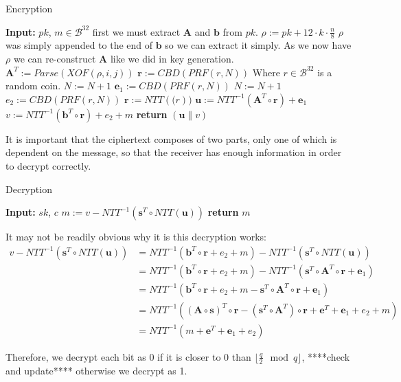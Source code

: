 \documentclass[a4paper, 10pt]{article}
\theoremstyle{definition}
\begin{document}
\begin{algorithm}[H]
    \caption{Encryption}
    \begin{algorithmic}
    \State \textbf{Input:} $pk$, $m \in \mathcal{B}^{32}$
    \State first we must extract $\mathbf{A}$ and $\mathbf{b}$ from $pk$.
    \State $\rho:=pk+12\cdot k\cdot \frac{n}{8}$ \Comment $\rho$ was simply appended to the end of $\mathbf{b}$ so we can extract it simply. As we now have $\rho$ we can re-construct $\mathbf{A}$ like we did in key generation.
            \State $\mathbf{A}^T:=Parse(XOF(\rho , i, j))$ 
        \EndFor
    \EndFor
        \State $\mathbf{r}:=CBD(PRF(r ,N))$ \Comment Where $r \in \mathcal{B}^{32}$ is a random coin.
        \State $N:=N+1$
    \EndFor
        \State $\mathbf{e}_1:=CBD(PRF(r ,N))$
        \State $N:=N+1$
    \EndFor
    \State $e_2:=CBD(PRF(r, N))$
    \State $\mathbf{r}:=NTT(\mathbf(r))$
    \State $\mathbf{u}:=NTT^{-1}(\mathbf{A}^T\circ \mathbf{r})+\mathbf{e}_1$
    \State $v:=NTT^{-1}(\mathbf{b}^T\circ \mathbf{r})+e_2 + m $
    \State \textbf{return} $(\mathbf{u}\|v)$
    \end{algorithmic}
\end{algorithm}

It is important that the ciphertext composes of two parts, only one of which is dependent on the message, so that the receiver has enough information in order to decrypt correctly.

\begin{algorithm}[H]
    \caption{Decryption}
    \begin{algorithmic}
    \State \textbf{Input:} $sk$, $c$
    \State $m:=v-NTT^{-1}(\mathbf{s}^T\circ NTT(\mathbf{u}))$
    \State \textbf{return} $m$
    \end{algorithmic}
\end{algorithm}

It may not be readily obvious why it is this decryption works:
\begin{align*}
    v-NTT^{-1}(\mathbf{s}^T\circ NTT(\mathbf{u})) &= NTT^{-1}(\mathbf{b}^T\circ \mathbf{r}+e_2+m)-NTT^{-1}(\mathbf{s}^T\circ NTT(\mathbf{u}))\\
    &=NTT^{-1}(\mathbf{b}^T\circ \mathbf{r}+e_2+m)-NTT^{-1}(\mathbf{s}^T\circ \mathbf{A}^T\circ \mathbf{r}+\mathbf{e}_1)\\
    &=NTT^{-1}(\mathbf{b}^T\circ \mathbf{r}+e_2+m-\mathbf{s}^T\circ \mathbf{A}^T\circ \mathbf{r}+\mathbf{e}_1)\\
    &=NTT^{-1}(( \mathbf{A} \circ \mathbf{s})^T \circ \mathbf{r} - (\mathbf{s}^T \circ \mathbf{A} ^T) \circ \mathbf{r} + \mathbf{e} ^T + \mathbf{e}_1 + e_2 + m)\\
    &=NTT^{-1}(m+\mathbf{e}^T+\mathbf{e}_1+e_2)
\end{align*}

Therefore, we decrypt each bit as 0 if it is closer to 0 than $\lfloor \frac{q}{2} \mod{q}\rfloor $, ****check and update**** otherwise we decrypt as 1.



    
\end{document}
